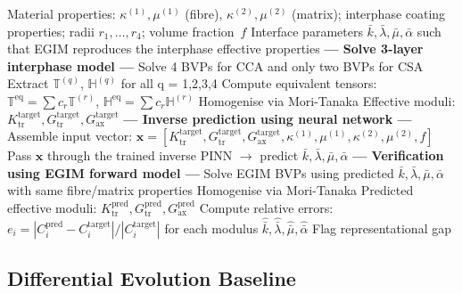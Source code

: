 \documentclass[oneside, 12pt, a4paper, bibliography=totoc]{book}
\newcommand{\bs}[1]{\bm{#1}}                       %
\begin{document}
\begin{algorithm}[htbp]
\caption{Generalized Inverse parameter identification pipeline}
\label{alg:inverse_cca}
\begin{algorithmic}[1]
\Require Material properties: $\kappa^{(1)}, \mu^{(1)}$ (fibre), $\kappa^{(2)}, \mu^{(2)}$ (matrix); interphase coating properties; radii $r_1, \ldots, r_4$; volume fraction~$f$
\Ensure Interface parameters $\bar{k}, \bar{\lambda}, \bar{\mu}, \bar{\alpha}$ such that EGIM reproduces the interphase effective properties
\Statex
\State \textbf{--- Solve 3-layer interphase model ---}
\State Solve 4 BVPs for CCA and only two BVPs for CSA
\State Extract $\mathbb{T}^{(q)}$, $\mathbb{H}^{(q)}$ for all q = 1,2,3,4
\State Compute equivalent tensors: $\mathbb{T}^{\text{eq}} = \sum c_r \mathbb{T}^{(r)}$, $\mathbb{H}^{\text{eq}} = \sum c_r \mathbb{H}^{(r)}$
\State Homogenise via Mori-Tanaka
\State Effective moduli: $K_{\text{tr}}^{\text{target}}, G_{\text{tr}}^{\text{target}}, G_{\text{ax}}^{\text{target}}$
\Statex
\State \textbf{--- Inverse prediction using neural network ---}
\State Assemble input vector: $\bs{x} = [K_{\text{tr}}^{\text{target}}, G_{\text{tr}}^{\text{target}}, G_{\text{ax}}^{\text{target}}, \kappa^{(1)}, \mu^{(1)}, \kappa^{(2)}, \mu^{(2)}, f]$
\State Pass $\bs{x}$ through the trained inverse PINN $\rightarrow$ predict $\bar{k}, \bar{\lambda}, \bar{\mu}, \bar{\alpha}$
\Statex
\State \textbf{--- Verification using EGIM forward model ---}
\State Solve EGIM BVPs using predicted $\bar{k}, \bar{\lambda}, \bar{\mu}, \bar{\alpha}$ with same fibre/matrix properties
\State Homogenise via Mori-Tanaka
\State Predicted effective moduli: $K_{\text{tr}}^{\text{pred}}, G_{\text{tr}}^{\text{pred}}, G_{\text{ax}}^{\text{pred}}$
\State Compute relative errors: $e_i = |C_i^{\text{pred}} - C_i^{\text{target}}| / |C_i^{\text{target}}|$ for each modulus
    \State \Return $\hat{\bar{k}}, \hat{\bar{\lambda}}, \hat{\bar{\mu}}, \hat{\bar{\alpha}}$ 
\Else
    \State Flag representational gap 
\EndIf
\end{algorithmic}
\end{algorithm}

\subsection{Differential Evolution Baseline}
\label{subsec:de_baseline}
\end{document}
